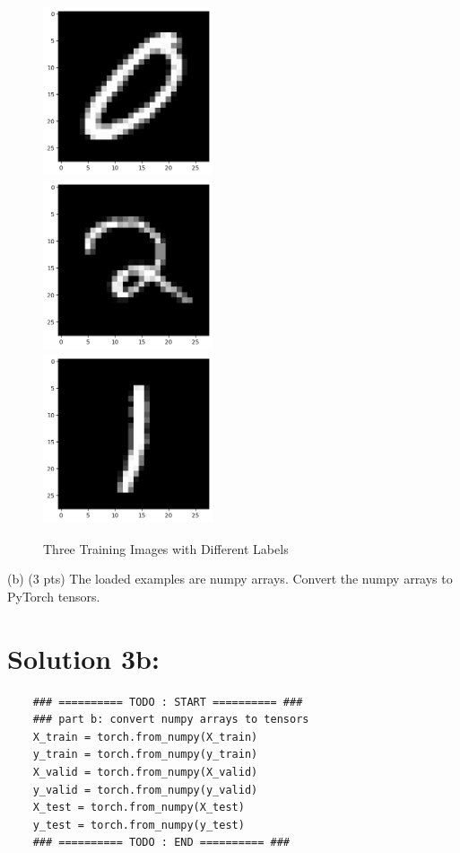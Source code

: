 \documentclass[10pt]{article}
\begin{document}
\begin{figure}
    \centering
    \includegraphics[width= 5cm, height = 5cm]{images/x_train_5.png} \\
    \includegraphics[width= 5cm, height = 5cm]{images/x_train_69.png} \\
    \includegraphics[width= 5cm, height = 5cm]{images/x_train_299.png} \\
    \caption{Three Training Images with Different Labels}
    \label{fig:enter-label}
\end{figure}


(b) (3 pts) The loaded examples are numpy arrays. Convert the numpy arrays to PyTorch tensors.

\section*{Solution 3b:}

\begin{verbatim}
    ### ========== TODO : START ========== ###
    ### part b: convert numpy arrays to tensors
    X_train = torch.from_numpy(X_train)
    y_train = torch.from_numpy(y_train)
    X_valid = torch.from_numpy(X_valid)
    y_valid = torch.from_numpy(y_valid)
    X_test = torch.from_numpy(X_test)
    y_test = torch.from_numpy(y_test)
    ### ========== TODO : END ========== ###
\end{verbatim}
\end{document}
